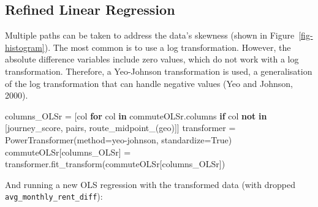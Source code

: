 \documentclass[
  number]{elsarticle}
\newenvironment{Shaded}{\begin{snugshade}}{\end{snugshade}}
\newcommand{\ControlFlowTok}[1]{\textcolor[rgb]{0.00,0.23,0.31}{\textbf{#1}}}
\newcommand{\KeywordTok}[1]{\textcolor[rgb]{0.00,0.23,0.31}{\textbf{#1}}}
\newcommand{\NormalTok}[1]{\textcolor[rgb]{0.00,0.23,0.31}{#1}}
\newcommand{\OperatorTok}[1]{\textcolor[rgb]{0.37,0.37,0.37}{#1}}
\newcommand{\StringTok}[1]{\textcolor[rgb]{0.13,0.47,0.30}{#1}}
\newcommand{\VariableTok}[1]{\textcolor[rgb]{0.07,0.07,0.07}{#1}}
\begin{document}
\subsection{Refined Linear
Regression}\label{sec-refined-linear-regression}

Multiple paths can be taken to address the data's skewness (shown in
Figure~\ref{fig-histogram}). The most common is to use a log
transformation. However, the absolute difference variables include zero
values, which do not work with a log transformation. Therefore, a
Yeo-Johnson transformation is used, a generalisation of the log
transformation that can handle negative values (Yeo and Johnson, 2000).

\begin{Shaded}
\begin{Highlighting}[]
\NormalTok{columns\_OLSr }\OperatorTok{=}\NormalTok{ [col }\ControlFlowTok{for}\NormalTok{ col }\KeywordTok{in}\NormalTok{ commuteOLSr.columns }\ControlFlowTok{if}\NormalTok{ col }\KeywordTok{not} \KeywordTok{in}\NormalTok{ [}\StringTok{\textquotesingle{}journey\_score\textquotesingle{}}\NormalTok{, }\StringTok{\textquotesingle{}pairs\textquotesingle{}}\NormalTok{, }\StringTok{\textquotesingle{}route\_midpoint\_(geo)\textquotesingle{}}\NormalTok{]]}
\NormalTok{transformer }\OperatorTok{=}\NormalTok{ PowerTransformer(method}\OperatorTok{=}\StringTok{\textquotesingle{}yeo{-}johnson\textquotesingle{}}\NormalTok{, standardize}\OperatorTok{=}\VariableTok{True}\NormalTok{)}
\NormalTok{commuteOLSr[columns\_OLSr] }\OperatorTok{=}\NormalTok{ transformer.fit\_transform(commuteOLSr[columns\_OLSr])}
\end{Highlighting}
\end{Shaded}

And running a new OLS regression with the transformed data (with dropped
\texttt{\textquotesingle{}avg\_monthly\_rent\_diff\textquotesingle{}}):
\end{document}

